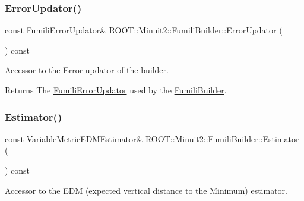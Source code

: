 \subsubsection{\texorpdfstring{ErrorUpdator()}{ErrorUpdator()}\hspace{0.1cm}{\footnotesize\ttfamily [3/3]}}
{\footnotesize\ttfamily const \mbox{\hyperlink{classROOT_1_1Minuit2_1_1FumiliErrorUpdator}{Fumili\+Error\+Updator}}\& R\+O\+O\+T\+::\+Minuit2\+::\+Fumili\+Builder\+::\+Error\+Updator (\begin{DoxyParamCaption}{ }\end{DoxyParamCaption}) const\hspace{0.3cm}{\ttfamily [inline]}}

Accessor to the Error updator of the builder.

\begin{DoxyReturn}{Returns}
The \mbox{\hyperlink{classROOT_1_1Minuit2_1_1FumiliErrorUpdator}{Fumili\+Error\+Updator}} used by the \mbox{\hyperlink{classROOT_1_1Minuit2_1_1FumiliBuilder}{Fumili\+Builder}}. 
\end{DoxyReturn}
\mbox{\label{classROOT_1_1Minuit2_1_1FumiliBuilder_a1e7bd763cd6677dd08d528079143d7b2}} 
\subsubsection{\texorpdfstring{Estimator()}{Estimator()}\hspace{0.1cm}{\footnotesize\ttfamily [1/3]}}
{\footnotesize\ttfamily const \mbox{\hyperlink{classROOT_1_1Minuit2_1_1VariableMetricEDMEstimator}{Variable\+Metric\+E\+D\+M\+Estimator}}\& R\+O\+O\+T\+::\+Minuit2\+::\+Fumili\+Builder\+::\+Estimator (\begin{DoxyParamCaption}{ }\end{DoxyParamCaption}) const\hspace{0.3cm}{\ttfamily [inline]}}

Accessor to the E\+DM (expected vertical distance to the Minimum) estimator.

